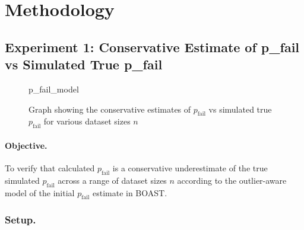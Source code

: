 \section{Methodology}

\subsection{Experiment 1: Conservative Estimate of p\_fail vs Simulated True p\_fail}
\label{sec:p_fail_experiment1}

    \begin{figure}[ht!]
        \centering
        {p_fail_model}
        \caption{Graph showing the conservative estimates of $p_\text{fail}$ vs simulated true $p_\text{fail}$ for various dataset sizes $n$}
        \label{fig:p_fail_experiment1}
    \end{figure}

    \paragraph{Objective.}
    To verify that calculated $p_\text{fail}$ is a conservative underestimate of the true simulated $p_\text{fail}$ across a range of dataset sizes $n$ according to the outlier-aware model of the initial $p_\text{fail}$ estimate in BOAST.

    \subsubsection{Setup.}

